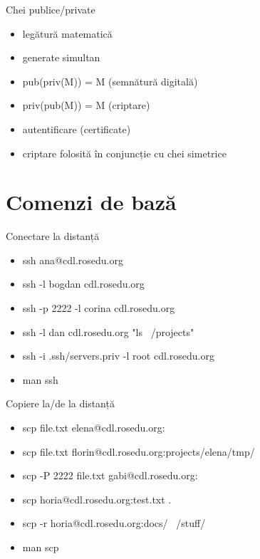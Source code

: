 \documentclass{beamer}
\begin{document}
\begin{frame}{Chei publice/private}
  \begin{itemize}
    \item legătură matematică
    \item generate simultan
    \item pub(priv(M)) = M (semnătură digitală)
    \item priv(pub(M)) = M (criptare)
    \item autentificare (certificate)
    \item criptare folosită în conjuncție cu chei simetrice
  \end{itemize}
\end{frame}

\section{Comenzi de bază}
\frame{\tableofcontents[currentsection]}

\begin{frame}{Conectare la distanță}
  \begin{itemize}
    \item ssh ana@cdl.rosedu.org
    \item ssh -l bogdan cdl.rosedu.org
    \item ssh -p 2222 -l corina cdl.rosedu.org
    \item ssh -l dan cdl.rosedu.org "ls ~/projects"
    \item ssh -i .ssh/servers.priv -l root cdl.rosedu.org
    \item man ssh
  \end{itemize}
\end{frame}

\begin{frame}{Copiere la/de la distanță}
  \begin{itemize}
    \item scp file.txt elena@cdl.rosedu.org:
    \item scp file.txt florin@cdl.rosedu.org:projects/elena/tmp/
    \item scp -P 2222 file.txt gabi@cdl.rosedu.org:
    \item scp horia@cdl.rosedu.org:test.txt .
    \item scp -r horia@cdl.rosedu.org:docs/ ~/stuff/
    \item man scp
  \end{itemize}
\end{frame}
\end{document}
